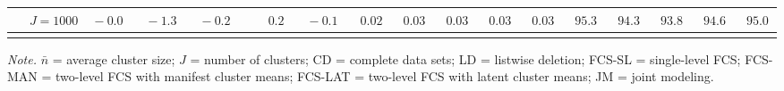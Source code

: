 \begin{sidewaystable}
\begin{threeparttable}
\begin{tabular}{llccccccccccccccc}
 & \nopagebreak $\;J=1000$  & $\phantom{0}{-}0.0\phantom{0}$ & $\phantom{0}{-}1.3\phantom{0}$ & $\phantom{0}{-}0.2\phantom{0}$ & $\phantom{0}\phantom{-}0.2\phantom{0}$ & $\phantom{0}{-}0.1\phantom{0}$ & $\phantom{0}0.02\phantom{0}$ & $\phantom{0}0.03\phantom{0}$ & $\phantom{0}0.03\phantom{0}$ & $\phantom{0}0.03\phantom{0}$ & $\phantom{0}0.03\phantom{0}$ & $\phantom{0}95.3\phantom{0}$ & $\phantom{0}94.3\phantom{0}$ & $\phantom{0}93.8\phantom{0}$ & $\phantom{0}94.6\phantom{0}$ & $\phantom{0}95.0\phantom{0}$ \\
[0.5ex]\hline\\[-1.6ex] 
\end{tabular}
\begin{tablenotes}{\footnotesize \textit{Note.} $\bar{n}$ = average cluster size; $J$ = number of clusters; CD = complete data sets; LD = listwise deletion; FCS-SL = single-level FCS; FCS-MAN = two-level FCS with manifest cluster means; FCS-LAT = two-level FCS with latent cluster means; JM = joint modeling.}\end{tablenotes}
\end{threeparttable}
\end{sidewaystable}
